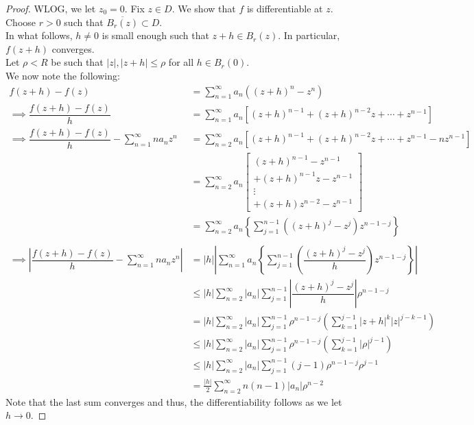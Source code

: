 \diffdisc*\label{thm:diffdisc2}
\begin{flushright}\hyperref[thm:diffdisc]{\upsym}\end{flushright}
\begin{proof}
	WLOG, we let $z_0 = 0.$ Fix $z \in D.$ We show that $f$ is differentiable at $z.$ Choose $r > 0$ such that $\overline{B_r(z)} \subset D.$\\
	In what follows, $h \neq 0$ is small enough such that $z + h \in B_r(z).$ In particular, $f(z+h)$ converges. \\
	Let $\rho < R$ be such that $|z|, |z + h| \le \rho$ for all $h \in B_r(0).$ \\
	We now note the following:
	\begin{align*} 
		f(z+h) - f(z) &= \sum_{n=1}^{\infty}a_n\left((z + h)^n - z^n\right)\\
		\implies \dfrac{f(z+h) - f(z)}{h} &= \sum_{n=1}^{\infty}a_n\left[(z + h)^{n-1} + (z + h)^{n-2}z + \cdots + z^{n-1}\right]\\
		\implies \dfrac{f(z+h) - f(z)}{h} - \sum_{n=1}^{\infty}na_nz^n &= \sum_{n=2}^{\infty}a_n\left[(z + h)^{n-1} + (z + h)^{n-2}z + \cdots + z^{n-1} - nz^{n-1}\right]\\
		&= \sum_{n=2}^{\infty}a_n \begin{bmatrix}
			(z + h)^{n-1} - z^{n-1}\\
			+ (z + h)^{n-1}z - z^{n-1}\\
			\vdots\\
			+ (z + h)z^{n-2} - z^{n-1}
		\end{bmatrix}\\
		&= \sum_{n=2}^{\infty}a_n\left\{\sum_{j=1}^{n-1}\left((z + h)^j - z^j\right)z^{n - 1 -j}\right\}\\~\\
		\implies \left|\dfrac{f(z+h) - f(z)}{h} - \sum_{n=1}^{\infty}na_nz^n\right| &= |h|\left|\sum_{n=1}^{\infty}a_n\left\{\sum_{j=1}^{n-1}\left(\dfrac{(z + h)^j - z^j}{h}\right)z^{n - 1 -j}\right\}\right|\\
		&\le |h|\sum_{n=2}^{\infty}|a_n|\sum_{j=1}^{n-1}\left|\dfrac{(z + h)^j - z^j}{h}\right|\rho^{n-1-j}\\
		&= |h|\sum_{n=2}^{\infty}|a_n|\sum_{j=1}^{n-1}\rho^{n-1-j}\left(\sum_{k=1}^{j-1}|z+h|^k|z|^{j-k-1}\right)\\
		&\le |h|\sum_{n=2}^{\infty}|a_n|\sum_{j=1}^{n-1}\rho^{n-1-j}\left(\sum_{k=1}^{j-1}|\rho|^{j-1}\right)\\
		&\le |h|\sum_{n=2}^{\infty}|a_n|\sum_{j=1}^{n-1}(j-1)\rho^{n-1-j}\rho^{j-1}\\
		&= \frac{|h|}{2}\sum_{n=2}^{\infty}n(n-1)|a_n|\rho^{n-2}
	\end{align*}
	Note that the last sum converges and thus, the differentiability follows as we let $h \to 0.$
\end{proof}


